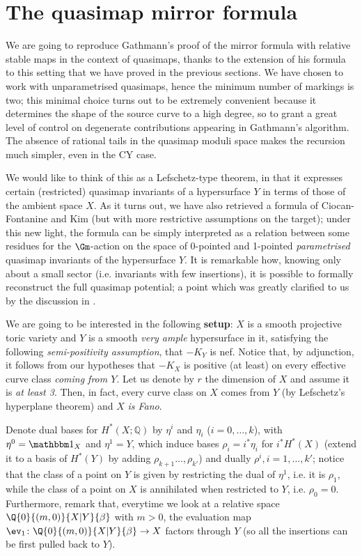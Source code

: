 \section{The quasimap mirror formula} \label{Section quasimap mirror theorem}

We are going to reproduce Gathmann's proof of the mirror formula with relative stable maps \cite{Ga-MF} in the context of quasimaps, thanks to the extension of his formula to this setting that we have proved in the previous sections. We have chosen to work with unparametrised quasimaps, hence the minimum number of markings is two; this minimal choice turns out to be extremely convenient because it determines the shape of the source curve to a high degree, so to grant a great level of control on degenerate contributions appearing in Gathmann's algorithm. The absence of rational tails in the quasimap moduli space makes the recursion much simpler, even in the CY case.

We would like to think of this as a Lefschetz-type theorem, in that it expresses certain (restricted) quasimap invariants of a hypersurface $Y$ in terms of those of the ambient space $X$. As it turns out, we have also retrieved a formula of Ciocan-Fontanine and Kim \cite[Corollary 5.5.1]{CF-K-wallcrossing} (but with more restrictive assumptions on the target); under this new light, the formula can be simply interpreted as a relation between some residues for the $\Gm$-action on the space of 0-pointed and 1-pointed \emph{parametrised} quasimap invariants of the hypersurface $Y$. It is remarkable how, knowing only about a small sector (i.e. invariants with few insertions), it is possible to formally reconstruct the full quasimap potential; a point which was greatly clarified to us by the discussion in \cite[Section 5.5]{CF-K-wallcrossing}.

We are going to be interested in the following \textbf{setup}: $X$ is a smooth projective toric variety and $Y$ is a smooth \emph{very ample} hypersurface in it, satisfying the following \emph{semi-positivity assumption}, that $-K_Y$ is nef. Notice that, by adjunction, it follows from our hypotheses that $-K_X$ is positive (at least) on every effective curve class \emph{coming from $Y$}. Let us denote by $r$ the dimension of $X$ and assume it is \emph{at least 3}. Then, in fact, every curve class on $X$ comes from $Y$ (by Lefschetz's hyperplane theorem) and $X$ \emph{is Fano}.

Denote dual bases for $H^*(X;\mathbb Q)$ by $\eta^i$ and $\eta_i$ ($i=0,\ldots,k$), with $\eta^0=\mathbbm 1_X$ and $\eta^1=Y$, which induce bases $\rho_i=i^*\eta_i$ for $i^*H^*(X)$ (extend it to a basis of $H^*(Y)$ by adding $\rho_{k+1}\ldots,\rho_{k'}$) and dually $\rho^i, i=1,\ldots,k'$; notice that the class of a point on $Y$ is given by restricting the dual of $\eta^1$, i.e. it is $\rho_1$, while the class of a point on $X$ is annihilated when restricted to $Y$, i.e. $\rho_0=0$. Furthermore, remark that, everytime we look at a relative space $\Q{0}{(m,0)}{X|Y}{\beta}$ with $m>0$, the evaluation map $\ev_1\colon \Q{0}{(m,0)}{X|Y}{\beta}\to X$ factors through $Y$ (so all the insertions can be first pulled back to $Y$).


